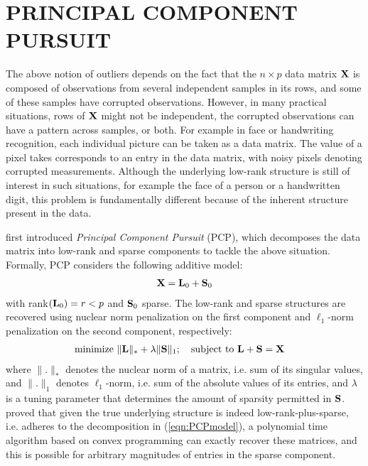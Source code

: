 \section*{\sffamily \Large PRINCIPAL COMPONENT PURSUIT}
\label{section:sec3}

The above notion of outliers depends on the fact that the $n \times p$ data matrix ${\mathbf{X}}$ is composed of observations from several independent samples in its rows, and some of these samples have corrupted observations. However, in many practical situations, rows of ${\mathbf{X}}$ might not be independent, the corrupted observations can have a pattern across samples, or both. For example in face or handwriting recognition, each individual picture can be taken as a data matrix. The value of a pixel takes corresponds to an entry in the data matrix, with noisy pixels denoting corrupted measurements. Although the underlying low-rank structure is still of interest in such situations, for example the face of a person or a handwritten digit, this problem is fundamentally different because of the inherent structure present in the data.

\cite{CandesEtal09} first introduced {\it Principal Component Pursuit} (PCP), which decomposes the data matrix into low-rank and sparse components to tackle the above situation. Formally, PCP considers the following additive model:
%
\begin{align}\label{eqn:PCPmodel}
{\mathbf{X}} = {\mathbf{L}}_0 + {\mathbf{S}}_0
\end{align}
%
with rank$({\mathbf{L}}_0) = r < p$ and ${\mathbf{S}}_0$ sparse. The low-rank and sparse structures are recovered using nuclear norm penalization on the first component and $\ell_1$-norm penalization on the second component, respectively:
%
\begin{align}\label{eqn:PCPobj}
& \text{minimize } \| {\mathbf{L}} \|_* + \lambda \| {\mathbf{S}} \|_1; \quad \text{subject to } {\mathbf{L}} + {\mathbf{S}} = {\mathbf{X}}
\end{align}
%
where $\|.\|_*$ denotes the nuclear norm of a matrix, i.e. sum of its singular values, and $\|.\|_1$ denotes $\ell_1$-norm, i.e. sum of the absolute values of its entries, and $\lambda $ is a tuning parameter that determines the amount of sparsity permitted in ${\mathbf{S}}$. \cite{CandesEtal09} proved that given the true underlying structure is indeed low-rank-plus-sparse, i.e. adheres to the decomposition in (\ref{eqn:PCPmodel}), a polynomial time algorithm based on convex programming can exactly recover these matrices, and this is possible for arbitrary magnitudes of entries in the sparse component.

